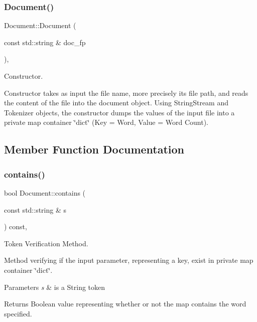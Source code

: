\subsubsection{\texorpdfstring{Document()}{Document()}}
{\footnotesize\ttfamily Document\+::\+Document (\begin{DoxyParamCaption}\item[{const std\+::string \&}]{doc\+\_\+fp }\end{DoxyParamCaption})\hspace{0.3cm}{\ttfamily [inline]}, {\ttfamily [explicit]}}



Constructor. 

Constructor takes as input the file name, more precisely its file path, and reads the content of the file into the document object. Using String\+Stream and Tokenizer objects, the constructor dumps the values of the input file into a private map container \char`\"{}dict\char`\"{} (Key = Word, Value = Word Count). 

\subsection{Member Function Documentation}
\mbox{\label{class_document_a68e12b27c40699cd3c2fff66a6161473}} 
\subsubsection{\texorpdfstring{contains()}{contains()}}
{\footnotesize\ttfamily bool Document\+::contains (\begin{DoxyParamCaption}\item[{const std\+::string \&}]{s }\end{DoxyParamCaption}) const\hspace{0.3cm}{\ttfamily [override]}, {\ttfamily [virtual]}}



Token Verification Method. 

Method verifying if the input parameter, representing a key, exist in private map container \char`\"{}dict\char`\"{}.


\begin{DoxyParams}{Parameters}
{\em s} & is a String token \\
\hline
\end{DoxyParams}
\begin{DoxyReturn}{Returns}
Boolean value representing whether or not the map contains the word specified. 
\end{DoxyReturn}


